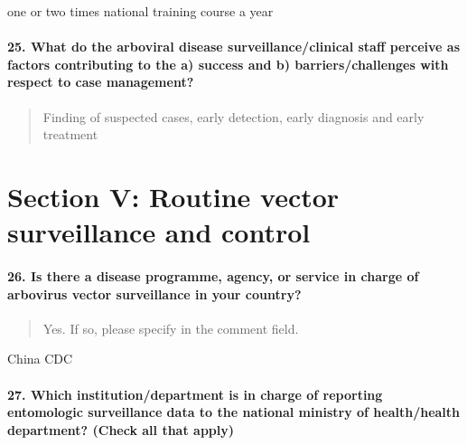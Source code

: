 \documentclass[
]{article}
\begin{document}
one or two times national training course a year

\hypertarget{what-do-the-arboviral-disease-surveillanceclinical-staff-perceive-as-factors-contributing-to-the-a-success-and-b-barrierschallenges-with-respect-to-case-management}{%
\paragraph{25. What do the arboviral disease surveillance/clinical staff
perceive as factors contributing to the a) success and b)
barriers/challenges with respect to case
management?}\label{what-do-the-arboviral-disease-surveillanceclinical-staff-perceive-as-factors-contributing-to-the-a-success-and-b-barrierschallenges-with-respect-to-case-management}}

\begin{quote}
Finding of suspected cases, early detection, early diagnosis and early
treatment
\end{quote}

\hypertarget{section-v-routine-vector-surveillance-and-control}{%
\section{Section V: Routine vector surveillance and
control}\label{section-v-routine-vector-surveillance-and-control}}

\hypertarget{is-there-a-disease-programme-agency-or-service-in-charge-of-arbovirus-vector-surveillance-in-your-country}{%
\paragraph{26. Is there a disease programme, agency, or service in
charge of arbovirus vector surveillance in your
country?}\label{is-there-a-disease-programme-agency-or-service-in-charge-of-arbovirus-vector-surveillance-in-your-country}}

\begin{quote}
Yes. If so, please specify in the comment field.
\end{quote}

China CDC

\hypertarget{which-institutiondepartment-is-in-charge-of-reporting-entomologic-surveillance-data-to-the-national-ministry-of-healthhealth-department-check-all-that-apply}{%
\paragraph{27. Which institution/department is in charge of reporting
entomologic surveillance data to the national ministry of health/health
department? (Check all that
apply)}\label{which-institutiondepartment-is-in-charge-of-reporting-entomologic-surveillance-data-to-the-national-ministry-of-healthhealth-department-check-all-that-apply}}
\end{document}
